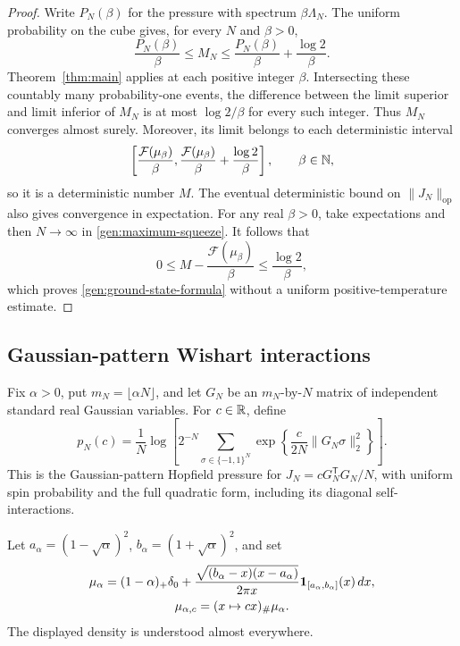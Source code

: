 \begin{proof}
Write $P_N(\beta)$ for the pressure with spectrum
$\beta\Lambda_N$.  The uniform probability on the cube gives, for
every $N$ and $\beta>0$,
\begin{equation}\label{gen:maximum-squeeze}
 \frac{P_N(\beta)}\beta
 \le M_N\le
 \frac{P_N(\beta)}\beta+\frac{\log2}\beta.
\end{equation}
Theorem~\ref{thm:main} applies at each positive integer $\beta$.
Intersecting these countably many probability-one events, the
difference between the limit superior and limit inferior of $M_N$ is
at most $\log2/\beta$ for every such integer.  Thus $M_N$ converges
almost surely.  Moreover, its limit belongs to each deterministic
interval
\[
 \left[\frac{\mathcal F(\mu_\beta)}\beta,
       \frac{\mathcal F(\mu_\beta)}\beta+\frac{\log2}\beta\right],
 \qquad \beta\in\mathbb N,
\]
so it is a deterministic number $M$.  The eventual deterministic bound
on $\|J_N\|_{\mathrm{op}}$ also gives convergence in expectation.
For any real $\beta>0$, take expectations and then $N\to\infty$ in
\eqref{gen:maximum-squeeze}.  It follows that
\[
 0\le M-\frac{\mathcal F(\mu_\beta)}\beta
 \le\frac{\log2}\beta,
\]
which proves \eqref{gen:ground-state-formula} without a uniform
positive-temperature estimate.
\end{proof}

\subsection{Gaussian-pattern Wishart interactions}

Fix $\alpha>0$, put $m_N=\lfloor\alpha N\rfloor$, and let $G_N$ be an
$m_N$-by-$N$ matrix of independent standard real Gaussian variables.
For $c\in\mathbb R$, define
\begin{equation}\label{gen:wishart-pressure}
 p_N(c)=\frac1N\log\left[
 2^{-N}\sum_{\sigma\in\{-1,1\}^N}
 \exp\left\{\frac{c}{2N}\|G_N\sigma\|_2^2\right\}\right].
\end{equation}
This is the Gaussian-pattern Hopfield pressure for
$J_N=cG_N^{\mathsf T}G_N/N$, with uniform spin probability and the full
quadratic form, including its diagonal self-interactions.

Let $a_\alpha=(1-\sqrt\alpha)^2$, $b_\alpha=(1+\sqrt\alpha)^2$, and set
\begin{equation}\label{gen:wishart-law}
 \begin{gathered}
 \mu_\alpha=(1-\alpha)_+\delta_0+
 \frac{\sqrt{(b_\alpha-x)(x-a_\alpha)}}{2\pi x}
 \mathbf 1_{[a_\alpha,b_\alpha]}(x)\,dx,\\
 \mu_{\alpha,c}=(x\mapsto cx)_\#\mu_\alpha.
 \end{gathered}
\end{equation}
The displayed density is understood almost everywhere.

